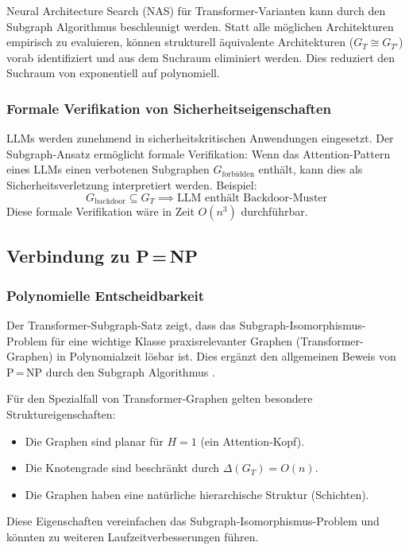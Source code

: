﻿\documentclass[a4paper,12pt]{article}
\theoremstyle{definition}
\begin{document}
Neural Architecture Search (NAS) für Transformer-Varianten kann durch
den Subgraph Algorithmus beschleunigt werden. Statt alle möglichen
Architekturen empirisch zu evaluieren, können strukturell äquivalente
Architekturen ($G_T \cong G_{T'}$) vorab identifiziert und aus dem
Suchraum eliminiert werden. Dies reduziert den Suchraum von exponentiell
auf polynomiell.

\subsubsection{Formale Verifikation von Sicherheitseigenschaften}

LLMs werden zunehmend in sicherheitskritischen Anwendungen eingesetzt.
Der Subgraph-Ansatz ermöglicht formale Verifikation: Wenn das Attention-Pattern
eines LLMs einen verbotenen Subgraphen $G_{\mathrm{forbidden}}$ enthält,
kann dies als Sicherheitsverletzung interpretiert werden. Beispiel:
\[
G_{\mathrm{backdoor}} \subseteq G_T \implies \text{LLM enthält Backdoor-Muster}
\]
Diese formale Verifikation wäre in Zeit $O(n^3)$ durchführbar.

\subsection{Verbindung zu P\,=\,NP}

\subsubsection{Polynomielle Entscheidbarkeit}

Der Transformer-Subgraph-Satz zeigt, dass das Subgraph-Isomorphismus-Problem
für eine wichtige Klasse praxisrelevanter Graphen (Transformer-Graphen) in
Polynomialzeit lösbar ist. Dies ergänzt den allgemeinen Beweis von P\,=\,NP
durch den Subgraph Algorithmus \cite{epp2026subgraph,epp2026pnp}.

Für den Spezialfall von Transformer-Graphen gelten besondere Struktureigenschaften:
\begin{itemize}
	\item Die Graphen sind planar für $H = 1$ (ein Attention-Kopf).
	\item Die Knotengrade sind beschränkt durch $\Delta(G_T) = O(n)$.
	\item Die Graphen haben eine natürliche hierarchische Struktur (Schichten).
\end{itemize}
Diese Eigenschaften vereinfachen das Subgraph-Isomorphismus-Problem
und könnten zu weiteren Laufzeitverbesserungen führen.
\end{document}
